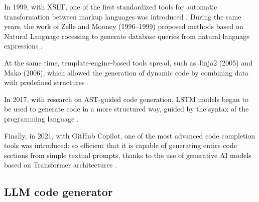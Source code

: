 In 1999, with XSLT, one of the first standardized tools for 
automatic transformation between markup languages was introduced 
\cite{xslt1999}. During the same years, the work of Zelle and 
Mooney (1996–1999) proposed methods based on Natural Language 
rocessing to generate database queries from natural language 
expressions \cite{zelle1996learning, mooney1997nlidb}.

At the same time, template-engine-based tools spread, such as 
Jinja2 (2005) and Mako (2006), which allowed the generation of 
dynamic code by combining data with predefined structures 
\cite{jinja2docs, makoengine}.

In 2017, with research on AST-guided code generation, LSTM 
models began to be used to generate code in a more structured 
way, guided by the syntax of the programming language 
\cite{yin2017syntactic}.

Finally, in 2021, with GitHub Copilot, one of the most advanced 
code completion tools was introduced: so efficient that it is 
capable of generating entire code sections from simple textual 
prompts, thanks to the use of generative AI models based on 
Transformer architectures \cite{chen2021codex}.




\subsection{LLM code generator} %